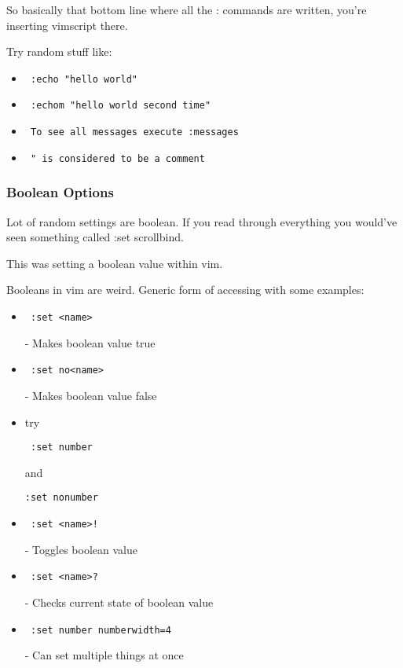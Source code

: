 \documentclass[12pt, letterpaper]{article}
\begin{document}
So basically that bottom line where all the : commands are written, you're
inserting vimscript there.

Try random stuff like: 
\begin{itemize}
    \item \begin{verbatim} :echo "hello world" \end{verbatim}
    \item \begin{verbatim} :echom "hello world second time" \end{verbatim}
    \item \begin{verbatim} To see all messages execute :messages \end{verbatim}
    \item \begin{verbatim} " is considered to be a comment \end{verbatim}
\end{itemize}

\subsubsection{Boolean Options}

Lot of random settings are boolean. If you read through everything you would've
seen something called :set scrollbind.

This was setting a boolean value within vim.

Booleans in vim are weird.
Generic form of accessing with some examples:
\begin{itemize}
    \item \begin{verbatim} :set <name> \end{verbatim}- Makes boolean value true 
    \item \begin{verbatim} :set no<name> \end{verbatim}- Makes boolean value
        false 
    \item try \begin{verbatim} :set number \end{verbatim} and \begin{verbatim}
:set nonumber \end{verbatim}
    \item \begin{verbatim} :set <name>! \end{verbatim}- Toggles boolean value 
    \item \begin{verbatim} :set <name>? \end{verbatim}- Checks current state of
        boolean value 
    \item \begin{verbatim} :set number numberwidth=4 \end{verbatim}- Can set
        multiple things at once 
\end{itemize}
\end{document}
